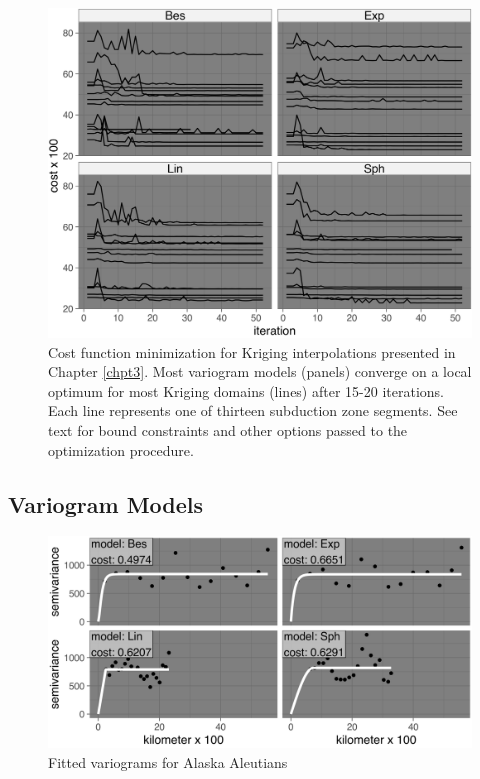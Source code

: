 \begin{figure}[htbp]

{\centering \includegraphics[width=1\linewidth,]{assets/figs/chpt3/optTrace} 

}

\caption[Cost function minimization for Kriging interpolations]{Cost function minimization for Kriging interpolations presented in Chapter \ref{chpt3}. Most variogram models (panels) converge on a local optimum for most Kriging domains (lines) after 15-20 iterations. Each line represents one of thirteen subduction zone segments. See text for bound constraints and other options passed to the optimization procedure.}\label{fig:optTrace}
\end{figure}

\clearpage

\hypertarget{vgrmModelsAppendix}{%
\subsection{Variogram Models}\label{vgrmModelsAppendix}}

\begin{figure}
\centering
\includegraphics{assets/figs/chpt3/AlaskaAleutiansVgrms.png}
\caption[Fitted variograms for Alaska Aleutians]{Fitted variograms for Alaska Aleutians}
\end{figure}

